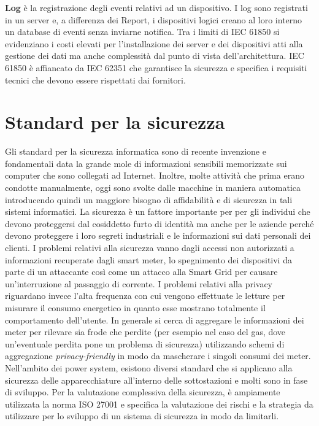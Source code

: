 \textbf{Log} è la registrazione degli eventi relativi ad un dispositivo. I log sono registrati in un server e, a differenza dei Report, i dispositivi logici creano al loro interno un database di eventi senza inviarne notifica.\newline\newline
Tra i limiti di IEC 61850 si evidenziano i costi elevati per l'installazione dei server e dei dispositivi atti alla gestione dei dati ma anche  complessità dal punto di vista dell'architettura. IEC 61850 è affiancato da IEC 62351 che garantisce la sicurezza e specifica i requisiti tecnici che devono essere rispettati dai fornitori.
\newpage
\section{Standard per la sicurezza}
Gli standard per la sicurezza informatica sono di recente invenzione e fondamentali data la grande mole di informazioni sensibili memorizzate sui computer che sono collegati ad Internet. Inoltre, molte attività che prima erano condotte manualmente, oggi sono svolte dalle macchine in maniera automatica introducendo quindi un maggiore bisogno di affidabilità e di sicurezza in tali sistemi informatici. La sicurezza è un fattore importante per per gli individui che devono proteggersi dal cosiddetto furto di identità ma anche per le aziende perché devono proteggere i loro segreti industriali e le informazioni sui dati personali dei clienti.\newline\newline
I problemi relativi alla sicurezza vanno dagli accessi non autorizzati a informazioni recuperate dagli smart meter, lo spegnimento dei dispositivi da parte di un attaccante così come un attacco alla Smart Grid per causare un'interruzione al passaggio di corrente. I problemi relativi alla privacy riguardano invece l’alta frequenza con cui vengono effettuate le letture per misurare il consumo energetico in quanto esse mostrano totalmente il comportamento dell’utente. In generale si cerca di aggregare le informazioni dei meter per rilevare sia frode che perdite (per esempio nel caso del gas, dove un'eventuale perdita pone un problema di sicurezza) utilizzando schemi di aggregazione \emph{privacy-friendly} in modo da mascherare i singoli consumi dei meter.
\newline\newline
Nell'ambito dei power system, esistono diversi standard che si applicano alla sicurezza delle apparecchiature all'interno delle sottostazioni e molti sono in fase di sviluppo. Per la valutazione complessiva della sicurezza, è ampiamente utilizzata la norma ISO 27001 e specifica la valutazione dei rischi e la strategia da utilizzare per lo sviluppo di un sistema di sicurezza in modo da limitarli.
